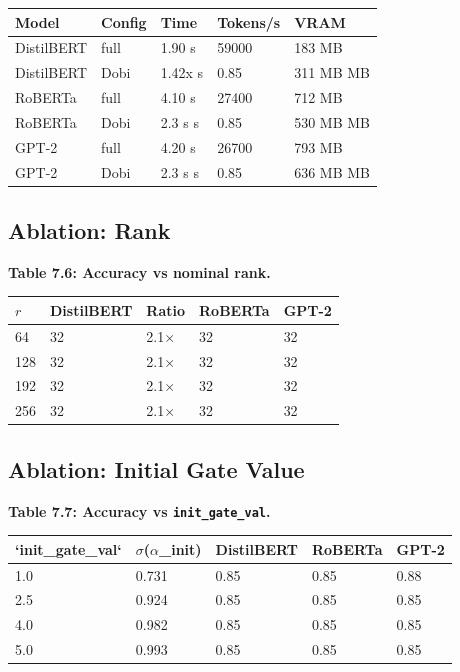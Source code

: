 \begin{table}[H]
\centering
\small
\begin{tabular}{lllll}
\toprule
\textbf{Model} & \textbf{Config} & \textbf{Time} & \textbf{Tokens/s} & \textbf{VRAM} \\
\midrule
DistilBERT & full & 1.90 s & 59000 & 183 MB \\
DistilBERT & Dobi & 1.42x s & 0.85 & 311 MB MB \\
RoBERTa & full & 4.10 s & 27400 & 712 MB \\
RoBERTa & Dobi & 2.3 s s & 0.85 & 530 MB MB \\
GPT-2 & full & 4.20 s & 26700 & 793 MB \\
GPT-2 & Dobi & 2.3 s s & 0.85 & 636 MB MB \\
\bottomrule
\end{tabular}
\end{table}

\subsection{Ablation: Rank}

\textbf{Table 7.6: Accuracy vs nominal rank.}

\begin{table}[H]
\centering
\small
\begin{tabular}{lllll}
\toprule
\textbf{$r$} & \textbf{DistilBERT} & \textbf{Ratio} & \textbf{RoBERTa} & \textbf{GPT-2} \\
\midrule
64 & 32 & 2.1$\times$ & 32 & 32 \\
128 & 32 & 2.1$\times$ & 32 & 32 \\
192 & 32 & 2.1$\times$ & 32 & 32 \\
256 & 32 & 2.1$\times$ & 32 & 32 \\
\bottomrule
\end{tabular}
\end{table}

\subsection{Ablation: Initial Gate Value}

\textbf{Table 7.7: Accuracy vs \texttt{init\_gate\_val}.}

\begin{table}[H]
\centering
\small
\begin{tabular}{lllll}
\toprule
\textbf{`init\_gate\_val`} & \textbf{$\sigma$($\alpha$\_init)} & \textbf{DistilBERT} & \textbf{RoBERTa} & \textbf{GPT-2} \\
\midrule
1.0 & 0.731 & 0.85 & 0.85 & 0.88 \\
2.5 & 0.924 & 0.85 & 0.85 & 0.85 \\
4.0 & 0.982 & 0.85 & 0.85 & 0.85 \\
5.0 & 0.993 & 0.85 & 0.85 & 0.85 \\
\bottomrule
\end{tabular}
\end{table}


